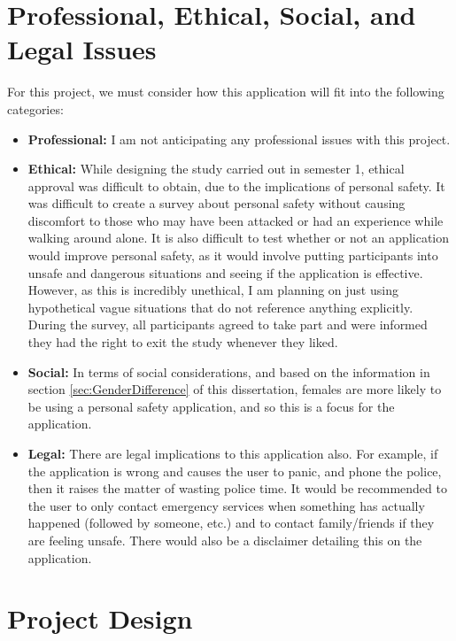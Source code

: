 \documentclass[a4paper]{report}
\begin{document}
\chapter{Professional, Ethical, Social, and Legal Issues}
\label{sec:PESL}
For this project, we must consider how this application will fit into the following categories:
\begin{itemize}
\item \textbf{Professional:} I am not anticipating any professional issues with this project. 
\item \textbf{Ethical:} While designing the study carried out in semester 1, ethical approval was difficult to obtain, due to the implications of personal safety. It was difficult to create a survey about personal safety without causing discomfort to those who may have been attacked or had an experience while walking around alone. It is also difficult to test whether or not an application would improve personal safety, as it would involve putting participants into unsafe and dangerous situations and seeing if the application is effective. However, as this is incredibly unethical, I am planning on just using hypothetical vague situations that do not reference anything explicitly. During the survey, all participants agreed to take part and were informed they had the right to exit the study whenever they liked.  
\item \textbf{Social:} In terms of social considerations, and based on the information in section \ref{sec:GenderDifference} of this dissertation, females are more likely to be using a personal safety application, and so this is a focus for the application. 
\item \textbf{Legal:} There are legal implications to this application also. For example, if the application is wrong and causes the user to panic, and phone the police, then it raises the matter of wasting police time. It would be recommended to the user to only contact emergency services when something has actually happened (followed by someone, etc.) and to contact family/friends if they are feeling unsafe. There would also be a disclaimer detailing this on the application. 
\end{itemize}
\newpage
\chapter{Project Design}
\label{sec:ProjectDesign}
\end{document}
